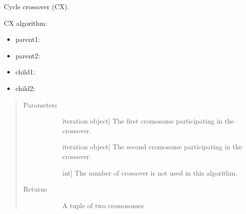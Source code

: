\documentclass[letterpaper,10pt,english]{sphinxmanual}
\begin{document}
\begin{fulllineitems}
\label{\detokenize{pygace:pygace.ga.cycle_crossover}}
Cycle crossover (CX).

CX algorithm:
\begin{itemize}
\item {} 
parent1: 

\item {} 
parent2: 

\item {} 
child1: 

\item {} 
child2: 

\end{itemize}
\begin{quote}\begin{description}
\item[{Parameters}] \leavevmode\begin{description}
\item[{}] \leavevmode{[}iteration object{]}
The first cromosome participating in the crossover.

\item[{}] \leavevmode{[}iteration object{]}
The second cromosome participating in the crossover.

\item[{}] \leavevmode{[}int{]}
The number of crossover is not used in this algorithm.

\end{description}

\item[{Returns}] \leavevmode\begin{description}
\item[{}] \leavevmode
A tuple of two cromosomes

\end{description}

\end{description}\end{quote}

\end{fulllineitems}
\end{document}
